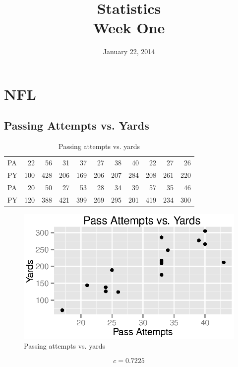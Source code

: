 \documentclass{exam}
\author{}
\date{January 22, 2014}
\title{Statistics \\ Week One}
\begin{document}
\maketitle
\tableofcontents

  \section{NFL}

  \subsection{Passing Attempts vs. Yards}

  \begin{table}[ht]
    \centering
    \begin{tabular}{lrrrrrrrrrr}
      \toprule
      PA & 22  & 56  & 31  & 37  & 27  & 38  & 40  & 22  & 27  & 26 \\
      PY & 100 & 428 & 206 & 169 & 206 & 207 & 284 & 208 & 261 & 220 \\
      \midrule
      PA & 20  & 50  & 27  & 53  & 28  & 34  & 39  & 57  & 35  & 46 \\
      PY & 120 & 388 & 421 & 399 & 269 & 295 & 201 & 419 & 234 & 300 \\
       \bottomrule
    \end{tabular}
    \caption{Passing attempts vs. yards}
  \end{table}

  \begin{figure}[H]
    \centering
    \includegraphics{figures/nfl/passing_attempts_vs_yds.eps}
    \caption{Passing attempts vs. yards}
  \end{figure}

  \[
    c = 0.7225
  \]
\end{document}
